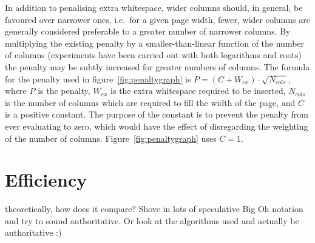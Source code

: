 In addition to penalising extra whitespace, wider columns should, in general, be favoured over narrower ones, i.e.~for a given page width, fewer, wider columns are generally considered preferable to a greater number of narrower columns. By multiplying the existing penalty by a smaller-than-linear function of the number of columns (experiments have been carried out with both logarithms and roots) the penalty may be subtly increased for greater numbers of columns. The formula for the penalty used in figure~\ref{fig:penaltygraph} is $P = (C + W_{ex})\cdot\sqrt{N_{cols}}$, where $P$ is the penalty, $W_{ex}$ is the extra whitespace required to be inserted, $N_{cols}$ is the number of columns which are required to fill the width of the page, and $C$ is a positive constant. The purpose of the constant is to prevent the penalty from ever evaluating to zero, which would have the effect of disregarding the weighting of the number of columns. Figure~\ref{fig:penaltygraph} uses $C=1$.

\section{Efficiency}
theoretically, how does it compare? Shove in lots of speculative Big Oh notation and try to sound authoritative. Or look at the algorithms used and
actually be authoritative :)



